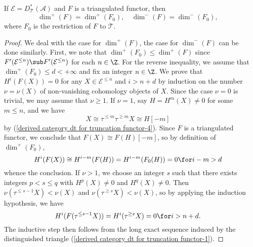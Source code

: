 \begin{proposition}\label{derived category functor dim on Serre subcat prop}
If $\mathcal{E}=D^*_\mathcal{T}(\mathcal{A})$ and $F$ is a triangulated functor, then
\[\dim^+(F)=\dim^+(F_0),\quad \dim^-(F)=\dim^-(F_0),\]
where $F_0$ is the restriction of $F$ to $\mathcal{T}$.
\end{proposition}
\begin{proof}
We deal with the case for $\dim^+(F)$, the case for $\dim^-(F)$ can be done similarly. First, we note that $\dim^+(F_0)\leq\dim^+(F)$ since $F'(\mathcal{E}^{\leq n})\sub F'(\mathcal{E}^{\leq n})$ for each $n\in\Z$. For the reverse inequality, we assume that $\dim^+(F_0)\leq d<+\infty$ and fix an integer $n\in\Z$. We prove that $H^i(F(X))=0$ for any $X\in\mathcal{E}^{\leq n}$ and $i>n+d$ by induction on the number $\nu=\nu(X)$ of non-vanishing cohomology objects of $X$. Since the case $\nu=0$ is trivial, we may assume that $\nu\geq 1$. If $\nu=1$, say $H=H^m(X)\neq 0$ for some $m\leq n$, and we have
\[X\cong\tau^{\leq m}\tau^{\geq m}X\cong H[-m]\]
by (\ref{derived category dt for truncation functor-4}). Since $F$ is a triangulated functor, we conclude that $F(X)\cong F(H)[-m]$, so by definition of $\dim^+(F_0)$,
\[H^i(F(X))\cong H^{i-m}(F(H))=H^{i-m}(F_0(H))=0\for i-m>d\]
whence the conclusion. If $\nu>1$, we choose an integer $s$ such that there exists integers $p<s\leq q$ with $H^p(X)\neq 0$ and $H^q(X)\neq 0$. Then $\nu(\tau^{\leq s-1}X)<\nu(X)$ and $\nu(\tau^{\geq s}X)<\nu(X)$, so by applying the induction hypothesis, we have
\[H^i(F(\tau^{\leq s-1}X))=H^i(\tau^{\geq s}X)=0\for i>n+d.\]
The inductive step then follows from the long exact sequence induced by the distinguished triangle (\ref{derived category dt for truncation functor-1}).
\end{proof}

